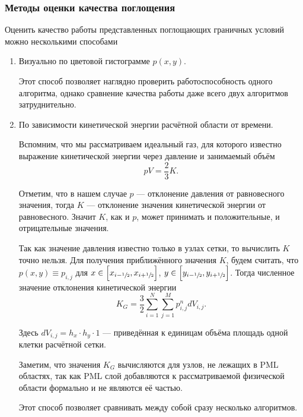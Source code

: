 \subsubsection{Методы оценки качества поглощения}

Оценить качество работы представленных поглощающих граничных условий можно несколькими способами

\begin{enumerate}
    \item Визуально по цветовой гистограмме $p(x,y)$. 
    
    Этот способ позволяет наглядно проверить работоспособность одного алгоритма, однако сравнение качества работы даже всего двух алгоритмов  затруднительно.
    
    \item По зависимости кинетической энергии расчётной области от времени.
    
    Вспомним, что мы рассматриваем идеальный газ, для которого известно выражение кинетической энергии через давление и занимаемый объём
    \begin{equation*}
        pV = \dfrac{2}{3} K .
    \end{equation*}
    
    Отметим, что в нашем случае $p$ --- отклонение давления от равновесного значения, тогда $K$ --- отклонение значения кинетической энергии от равновесного. Значит $K$, как и $p$, может принимать и положительные, и отрицательные значения.
    
    Так как значение давления известно только в узлах сетки, то вычислить $K$ точно нельзя. Для получения приближённого значения $K$, будем считать, что $p(x,y) \equiv p_{i,j}$ для $x \in \left[x_{i-\sfrac{1}{2}}, x_{i+\sfrac{1}{2}}\right]$, $y \in \left[y_{i-\sfrac{1}{2}}, y_{i+\sfrac{1}{2}}\right]$. Тогда численное значение отклонения кинетической энергии
    \begin{equation*}
        K_G = \dfrac{3}{2} \sum_{i=1}^N \sum_{j=1}^M p_{i,j}^n dV_{i,j}.
    \end{equation*}
    
    Здесь $dV_{i,j} = h_x \cdot h_y \cdot 1$ --- приведённая к единицам объёма площадь одной клетки расчётной сетки. 
    
    Заметим, что значения $K_G$ вычисляются для узлов, не лежащих в PML областях, так как PML слой добавляются к рассматриваемой физической области формально и не являются её частью.
    
    Этот способ позволяет сравнивать между собой сразу несколько алгоритмов.
    

\end{enumerate}
